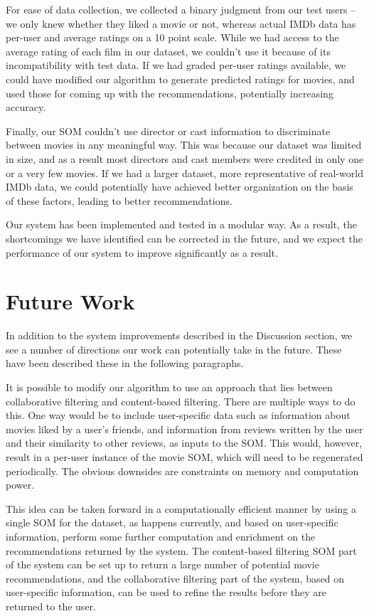 \documentclass[conference]{IEEEtran}
\begin{document}
For ease of data collection, we collected a binary judgment from our test users – we only knew whether they liked a movie or not, whereas actual IMDb data has per-user and average ratings on a 10 point scale. While we had access to the average rating of each film in our dataset, we couldn't use it because of its incompatibility with test data. If we had graded per-user ratings available, we could have modified our algorithm to generate predicted ratings for movies, and used those for coming up with the recommendations, potentially increasing accuracy.

Finally, our SOM couldn't use director or cast information to discriminate between movies in any meaningful way. This was because our dataset was limited in size, and as a result most directors and cast members were credited in only one or a very few movies. If we had a larger dataset, more representative of real-world IMDb data, we could potentially have achieved better organization on the basis of these factors, leading to better recommendations.

Our system has been implemented and tested in a modular way. As a result, the shortcomings we have identified can be corrected in the future, and we expect the performance of our system to improve significantly as a result.

\section{Future Work}
In addition to the system improvements described in the Discussion section, we see a number of directions our work can potentially take in the future. These have been described these in the following paragraphs.

It is possible to modify our algorithm to use an approach that lies between collaborative filtering and content-based filtering. There are multiple ways to do this. One way would be to include user-specific data such as information about movies liked by a user's friends, and information from reviews written by the user and their similarity to other reviews, as inputs to the SOM. This would, however, result in a per-user instance of the movie SOM, which will need to be regenerated periodically. The obvious downsides are constraints on memory and computation power.

This idea can be taken forward in a computationally efficient manner by using a single SOM for the dataset, as happens currently, and based on user-specific information, perform some further computation and enrichment on the recommendations returned by the system. The content-based filtering SOM part of the system can be set up to return a large number of potential movie recommendations, and the collaborative filtering part of the system, based on user-specific information, can be used to refine the results before they are returned to the user.
\end{document}
